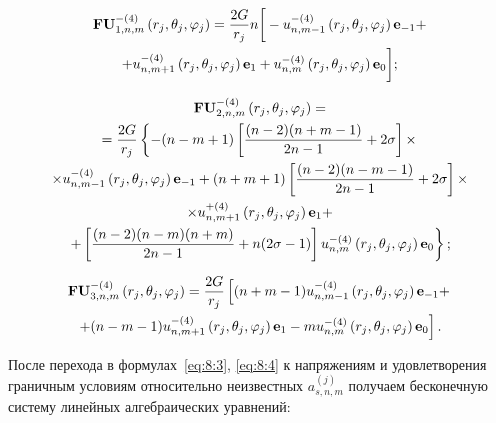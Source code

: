 \begin{multline}
{\bf{FU}}_{1,n,m}^{ - (4)}\left( {{r_j},{\theta _j},{\varphi _j}} \right) = \frac{{2G}}{{{r_j}}}n\bigg[ - u_{n,m - 1}^{ - (4)}\left( {{r_j},{\theta _j},{\varphi _j}} \right){{\bf{e}}_{ - 1}} + \\
+ u_{n,m + 1}^{ - (4)}\left( {{r_j},{\theta _j},{\varphi _j}} \right){{\bf{e}}_1} + u_{n,m}^{ - (4)}\left( {{r_j},{\theta _j},{\varphi _j}} \right){{\bf{e}}_0} \bigg];
\label{eq:8:f4}
\end{multline}

\begin{multline}
{\bf{FU}}_{2,n,m}^{ - (4)}\left( {{r_j},{\theta _j},{\varphi _j}} \right) = \\
= \frac{{2G}}{{{r_j}}}\left\{ { - (n - m + 1)\left[ {\frac{{(n - 2)(n + m - 1)}}{{2n - 1}} + 2\sigma } \right] \times } \right.\\
\times u_{n,m - 1}^{ - (4)}\left( {{r_j},{\theta _j},{\varphi _j}} \right){{\bf{e}}_{ - 1}} + (n + m + 1)\left[ {\frac{{(n - 2)(n - m - 1)}}{{2n - 1}} + 2\sigma } \right] \times \\
\times u_{n,m + 1}^{ + (4)}\left( {{r_j},{\theta _j},{\varphi _j}} \right){{\bf{e}}_1} + \\
\left. { + \left[ {\frac{{(n - 2)(n - m)(n + m)}}{{2n - 1}} + n(2\sigma  - 1)} \right]u_{n,m}^{ - (4)}\left( {{r_j},{\theta _j},{\varphi _j}} \right){{\bf{e}}_0}} \right\};
\label{eq:8:f5}
\end{multline}

\begin{multline}
{\bf{FU}}_{3,n,m}^{ - (4)}\left( {{r_j},{\theta _j},{\varphi _j}} \right) = \frac{{2G}}{{{r_j}}}\left[ {(n + m - 1)u_{n,m - 1}^{ - (4)}\left( {{r_j},{\theta _j},{\varphi _j}} \right){{\bf{e}}_{ - 1}} + } \right.\\
\left. { + (n - m - 1)u_{n,m + 1}^{ - (4)}\left( {{r_j},{\theta _j},{\varphi _j}} \right){{\bf{e}}_1} - mu_{n,m}^{ - (4)}\left( {{r_j},{\theta _j},{\varphi _j}} \right){{\bf{e}}_0}} \right].
\label{eq:8:f6}
\end{multline}

После перехода в формулах~\eqref{eq:8:3}, \eqref{eq:8:4} к напряжениям и удовлетворения граничным условиям относительно неизвестных $a_{s,n,m}^{(j)}$ получаем бесконечную систему линейных алгебраических уравнений:

